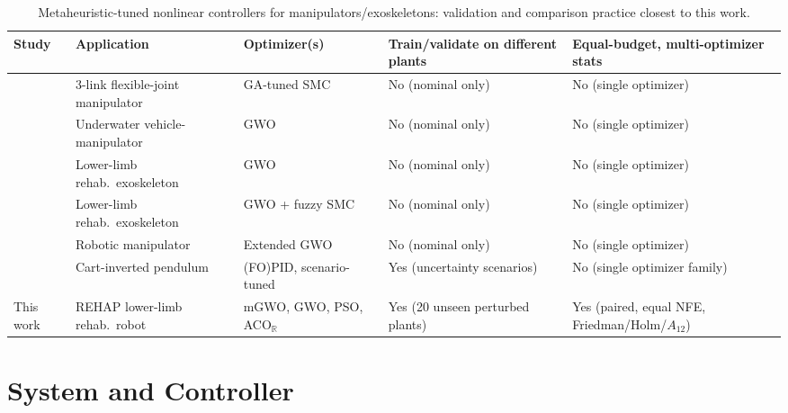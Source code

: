 \documentclass[10pt,journal,compsoc]{IEEEtran}
\newcommand{\mgwo}{mGWO}
\newcommand{\acor}{ACO$_\mathbb{R}$}
\newcommand{\rehap}{REHAP}
\begin{document}
\begin{table}[t]
\centering\footnotesize
\caption{Metaheuristic-tuned nonlinear controllers for manipulators/exoskeletons: validation and comparison practice closest to this work.}
\label{tab:sota}
\begin{tabularx}{\linewidth}{@{}l X X X X@{}}
\toprule
Study & Application & Optimizer(s) & Train/validate on different plants & Equal-budget, multi-optimizer stats\\
\midrule
\cite{azeez2023} & 3-link flexible-joint manipulator & GA-tuned SMC & No (nominal only) & No (single optimizer)\\
\cite{dai2023} & Underwater vehicle-manipulator & GWO & No (nominal only) & No (single optimizer)\\
\cite{faraj2023} & Lower-limb rehab.\ exoskeleton & GWO & No (nominal only) & No (single optimizer)\\
\cite{zheng2026} & Lower-limb rehab.\ exoskeleton & GWO + fuzzy SMC & No (nominal only) & No (single optimizer)\\
\cite{rezoug2022} & Robotic manipulator & Extended GWO & No (nominal only) & No (single optimizer)\\
\cite{zorlu2026} & Cart-inverted pendulum & (FO)PID, scenario-tuned & Yes (uncertainty scenarios) & No (single optimizer family)\\
This work & \rehap{} lower-limb rehab.\ robot & \mgwo{}, GWO, PSO, \acor{} & Yes (20 unseen perturbed plants) & Yes (paired, equal NFE, Friedman/Holm/$A_{12}$)\\
\bottomrule
\end{tabularx}
\end{table}

\section{System and Controller}\label{sec:model}
\end{document}
